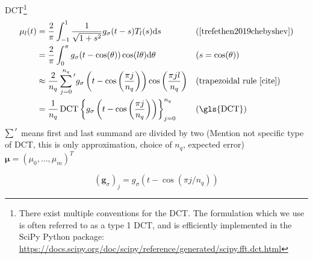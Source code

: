 \gls{DCT}\footnote{There exist multiple conventions for the DCT.
The formulation which we use is often referred to as a type 1 DCT,
and is efficiently implemented in the SciPy Python package:
\url{https://docs.scipy.org/doc/scipy/reference/generated/scipy.fft.dct.html}}
\begin{align}
    \mu_l(t) 
    &= \frac{2}{\pi} \int_{-1}^1 \frac{1}{\sqrt{1 + s^2}} g_{\sigma}(t - s) T_l(s) \mathrm{d}s
    && \text{(\cite[Theorem~3.1]{trefethen2019chebyshev})} \notag \\
    &= \frac{2}{\pi} \int_{0}^{\pi} g_{\sigma}(t - \cos(\theta)) \cos(l\theta) \mathrm{d}\theta
    && \text{($s = \cos(\theta))$} \notag \\
    &\approx \frac{2}{n_q} \sum_{j=0}^{n_q} {\vphantom{\sum}}' g_{\sigma}\left(t - \cos\left(\frac{\pi j}{n_q}\right)\right) \cos\left(\frac{\pi j l}{n_q}\right)
    && \text{(trapezoidal rule [cite])} \notag \\
    &= \frac{1}{n_q} \operatorname{DCT}\left\{g_{\sigma}\left(t - \cos\left(\frac{\pi j}{n_q}\right) \right)\right\}_{j=0}^{n_q}
    && \text{(\gls{DCT})}
    \label{equ:2-chebyshev-SS-DCT}
\end{align}
$\sum{\vphantom{\sum}}'$ means first and last summand are divided by two
(Mention not specific type of DCT, this is only approximation, choice of $n_q$,
expected error)
$\boldsymbol{\mu} = (\mu_0, \dots, \mu_m)^T$

\begin{equation}
    (\boldsymbol{g}_{\sigma})_j = g_{\sigma}(t - \cos(\pi j / n_q))
    \label{equ:2-chebyshev-function-vector}
\end{equation}

